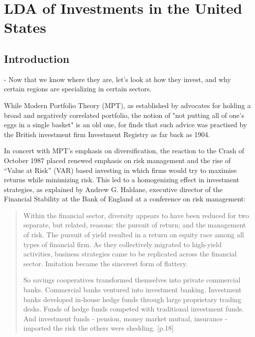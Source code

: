 \chapter{LDA of Investments in the United States} 
\section{Introduction}
\nocite{tmpackage} \nocite{LDAvis} \nocite{Stargazer}

- Now that we know where they are, let's look at how they invest, and why certain regions are specializing in certain sectors.  

While Modern Portfolio Theory (MPT), as established by \cite{Markowitz1952} advocates for holding a broad and negatively correlated portfolio, the notion of "not putting all of one's eggs in a single basket" is an old one, for \cite{Lofthouse53} finds that such advice was practised by the British investment firm Investment Registry as far back as 1904.  

In concert with MPT's emphasis on diversification, the reaction to the Crash of October 1987 placed renewed emphasis on risk management and the rise of ``Value at Risk'' (VAR) based investing in which firms would try to maximise returns while minimizing risk.  This led to a homogenizing effect in investment strategies, as explained by Andrew G. Haldane, executive director of the Financial Stability at the Bank of England at a conference on risk management:

\begin{quote}
	Within the financial sector, diversity appears to have been reduced for two separate, but related, reasons:  the pursuit of return;  and the management of risk.  The pursuit of yield resulted in a return on equity race among all types of financial firm.  As they collectively migrated to high-yield activities, business strategies came to be replicated across the financial sector.  Imitation became the sincerest form of flattery.
	
	So savings cooperatives transformed themselves into private commercial banks.  Commercial banks ventured into investment banking.  Investment banks developed in-house hedge funds through large proprietary trading desks.  Funds of hedge funds competed with traditional investment funds.  And investment funds - pension, money market mutual, insurance - imported the risk the others were shedding.   \citep{Haldane2009}[p.18]
\end{quote} 

